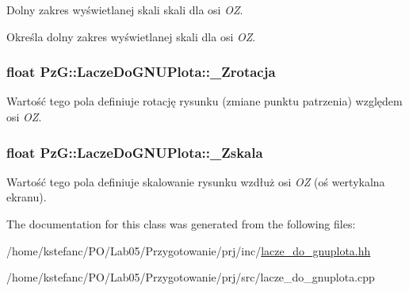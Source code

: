 Dolny zakres wyświetlanej skali skali dla osi {\itshape O\+Z}. 

Określa dolny zakres wyświetlanej skali dla osi {\itshape O\+Z}. \hypertarget{class_pz_g_1_1_lacze_do_g_n_u_plota_aa65781b1ff96dfb31a780e98ee28d6ed}{
\subsubsection[{\+\_\+\+Zrotacja}]{\setlength{\rightskip}{0pt plus 5cm}float Pz\+G\+::\+Lacze\+Do\+G\+N\+U\+Plota\+::\+\_\+\+Zrotacja\hspace{0.3cm}{\ttfamily [protected]}}}\label{class_pz_g_1_1_lacze_do_g_n_u_plota_aa65781b1ff96dfb31a780e98ee28d6ed}
Wartość tego pola definiuje rotację rysunku (zmiane punktu patrzenia) względem osi {\itshape O\+Z}. \hypertarget{class_pz_g_1_1_lacze_do_g_n_u_plota_a85446d06b2d714b2f852ef43c47c73c1}{
\subsubsection[{\+\_\+\+Zskala}]{\setlength{\rightskip}{0pt plus 5cm}float Pz\+G\+::\+Lacze\+Do\+G\+N\+U\+Plota\+::\+\_\+\+Zskala\hspace{0.3cm}{\ttfamily [protected]}}}\label{class_pz_g_1_1_lacze_do_g_n_u_plota_a85446d06b2d714b2f852ef43c47c73c1}
Wartość tego pola definiuje skalowanie rysunku wzdłuż osi {\itshape O\+Z} (oś wertykalna ekranu). 

The documentation for this class was generated from the following files\+:\begin{DoxyCompactItemize}
\item 
/home/kstefanc/\+P\+O/\+Lab05/\+Przygotowanie/prj/inc/\hyperlink{lacze__do__gnuplota_8hh}{lacze\+\_\+do\+\_\+gnuplota.\+hh}\item 
/home/kstefanc/\+P\+O/\+Lab05/\+Przygotowanie/prj/src/lacze\+\_\+do\+\_\+gnuplota.\+cpp\end{DoxyCompactItemize}
